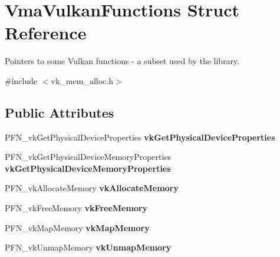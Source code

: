 \hypertarget{structVmaVulkanFunctions}{}\section{Vma\+Vulkan\+Functions Struct Reference}
\label{structVmaVulkanFunctions}


Pointers to some Vulkan functions -\/ a subset used by the library.  




{\ttfamily \#include $<$vk\+\_\+mem\+\_\+alloc.\+h$>$}

\subsection*{Public Attributes}
\begin{DoxyCompactItemize}
\item 
\mbox{\label{structVmaVulkanFunctions_a77b7a74082823e865dd6546623468f96}} 
P\+F\+N\+\_\+vk\+Get\+Physical\+Device\+Properties {\bfseries vk\+Get\+Physical\+Device\+Properties}
\item 
\mbox{\label{structVmaVulkanFunctions_a60d25c33bba06bb8592e6875cbaa9830}} 
P\+F\+N\+\_\+vk\+Get\+Physical\+Device\+Memory\+Properties {\bfseries vk\+Get\+Physical\+Device\+Memory\+Properties}
\item 
\mbox{\label{structVmaVulkanFunctions_a2943bf99dfd784a0e8f599d987e22e6c}} 
P\+F\+N\+\_\+vk\+Allocate\+Memory {\bfseries vk\+Allocate\+Memory}
\item 
\mbox{\label{structVmaVulkanFunctions_a4c658701778564d62034255b5dda91b4}} 
P\+F\+N\+\_\+vk\+Free\+Memory {\bfseries vk\+Free\+Memory}
\item 
\mbox{\label{structVmaVulkanFunctions_ab5c1f38dea3a2cf00dc9eb4f57218c49}} 
P\+F\+N\+\_\+vk\+Map\+Memory {\bfseries vk\+Map\+Memory}
\item 
\mbox{\label{structVmaVulkanFunctions_acc798589736f0becb317fc2196c1d8b9}} 
P\+F\+N\+\_\+vk\+Unmap\+Memory {\bfseries vk\+Unmap\+Memory}
\item 
\mbox{\label{structVmaVulkanFunctions_a33c322f4c4ad2810f8a9c97a277572f9}} 

\end{DoxyCompactItemize}
